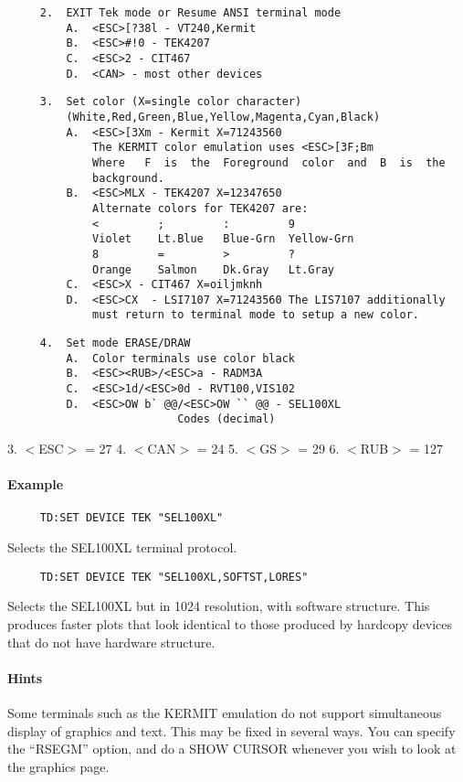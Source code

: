\begin{verbatim}
     2.  EXIT Tek mode or Resume ANSI terminal mode 
         A.  <ESC>[?38l - VT240,Kermit 
         B.  <ESC>#!0 - TEK4207 
         C.  <ESC>2 - CIT467 
         D.  <CAN> - most other devices 
\end{verbatim}

\begin{verbatim}
     3.  Set color (X=single color character) 
         (White,Red,Green,Blue,Yellow,Magenta,Cyan,Black) 
         A.  <ESC>[3Xm - Kermit X=71243560 
             The KERMIT color emulation uses <ESC>[3F;Bm 
             Where   F  is  the  Foreground  color  and  B  is  the
             background.  
         B.  <ESC>MLX - TEK4207 X=12347650 
             Alternate colors for TEK4207 are:  
             <         ;         :         9 
             Violet    Lt.Blue   Blue-Grn  Yellow-Grn 
             8         =         >         ?  
             Orange    Salmon    Dk.Gray   Lt.Gray 
         C.  <ESC>X - CIT467 X=oiljmknh 
         D.  <ESC>CX  - LSI7107 X=71243560 The LIS7107 additionally
             must return to terminal mode to setup a new color.  
\end{verbatim}

\begin{verbatim}
     4.  Set mode ERASE/DRAW 
         A.  Color terminals use color black 
         B.  <ESC><RUB>/<ESC>a - RADM3A 
         C.  <ESC>1d/<ESC>0d - RVT100,VIS102 
         D.  <ESC>OW b` @@/<ESC>OW `` @@ - SEL100XL 
                          Codes (decimal)
\end{verbatim}
3.  $<$ESC$>$ = 27 
4.  $<$CAN$>$ = 24 
5.  $<$GS$>$ = 29 
6.  $<$RUB$>$ = 127 
\paragraph{Example}
\begin{verbatim}
     TD:SET DEVICE TEK "SEL100XL" 
\end{verbatim}
Selects the SEL100XL terminal protocol.  
\begin{verbatim}
     TD:SET DEVICE TEK "SEL100XL,SOFTST,LORES" 
\end{verbatim}
Selects   the  SEL100XL  but  in  1024  resolution,  with  software
structure.  This produces faster plots that look identical to those
produced by hardcopy devices that do not have hardware structure.  
\paragraph{Hints}
Some  terminals  such  as  the  KERMIT  emulation  do  not  support
simultaneous display of graphics and text.  This may  be  fixed  in
several  ways.   You  can  specify  the  ``RSEGM''  option,  and do a
SHOW CURSOR whenever you wish to look at the graphics page.  

